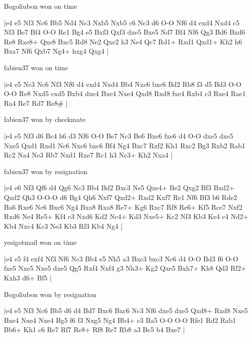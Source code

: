 Bogoliubon won on time

\makegametitle
|e4 e5 Nf3 Nc6 Bb5 Nd4 Nc3 Nxb5 Nxb5 c6 Nc3 d6 O-O Nf6 d4 exd4 Nxd4 c5 Nf3 Be7 Bf4 O-O Re1 Bg4 e5 Bxf3 Qxf3 dxe5 Bxe5 Nd7 Bf4 Nf6 Qg3 Bd6 Bxd6 Re8 Rxe8+ Qxe8 Bxc5 Rd8 Ne2 Qxe2 h3 Ne4 Qc7 Rd1+ Rxd1 Qxd1+ Kh2 h6 Bxa7 Nf6 Qxb7 Ng4+ hxg4 Qxg4  |

\showboard

fabien37 won on time

\makegametitle
|e4 e5 Nc3 Nc6 Nf3 Nf6 d4 exd4 Nxd4 Bb4 Nxc6 bxc6 Bd2 Rb8 f3 d5 Bd3 O-O O-O Re8 Nxd5 cxd5 Bxb4 dxe4 Bxe4 Nxe4 Qxd8 Rxd8 fxe4 Rxb4 c3 Rxe4 Rae1 Ra4 Re7 Rd7 Re8\#  |

\showboard

fabien37 won by checkmate

\makegametitle
|e4 e5 Nf3 d6 Bc4 h6 d3 Nf6 O-O Be7 Nc3 Be6 Bxe6 fxe6 d4 O-O dxe5 dxe5 Nxe5 Qxd1 Rxd1 Nc6 Nxc6 bxc6 Bf4 Ng4 Bxc7 Rxf2 Kh1 Rxc2 Bg3 Rxb2 Rab1 Rc2 Na4 Ne3 Rb7 Nxd1 Rxe7 Rc1 h3 Nc3+ Kh2 Nxa4  |

\showboard

fabien37 won by resignation

\makegametitle
|e4 e6 Nf3 Qf6 d4 Qg6 Nc3 Bb4 Bd2 Bxc3 Ne5 Qxe4+ Be2 Qxg2 Bf3 Bxd2+ Qxd2 Qh3 O-O-O d6 Bg4 Qh6 Nxf7 Qxd2+ Rxd2 Kxf7 Re1 Nf6 Bf3 b6 Rde2 Ba6 Rxe6 Nc6 Bxc6 Ng4 Bxa8 Rxa8 Re7+ Kg6 Rxc7 Rf8 Re6+ Kf5 Rce7 Nxf2 Rxd6 Ne4 Re5+ Kf4 c3 Nxd6 Kd2 Nc4+ Kd3 Nxe5+ Kc2 Nf3 Kb3 Ke4 c4 Nd2+ Kb4 Nxc4 Kc3 Ne3 Kb3 Rf3 Kb4 Ng4  |

\showboard

yesigotmail won on time

\makegametitle
|e4 e5 f4 exf4 Nf3 Nf6 Nc3 Bb4 e5 Nh5 a3 Bxc3 bxc3 Nc6 d4 O-O Bd3 f6 O-O fxe5 Nxe5 Nxe5 dxe5 Qg5 Rxf4 Nxf4 g3 Nh3+ Kg2 Qxe5 Bxh7+ Kh8 Qd3 Rf2+ Kxh3 d6+ Bf5  |

\showboard

Bogoliubon won by resignation

\makegametitle
|e4 e5 Nf3 Nc6 Bb5 d6 d4 Bd7 Bxc6 Bxc6 Nc3 Nf6 dxe5 dxe5 Qxd8+ Rxd8 Nxe5 Bxe4 Nxe4 Nxe4 Bg5 f6 f3 Nxg5 Ng4 Bb4+ c3 Ba5 O-O O-O Rfe1 Rd2 Rab1 Bb6+ Kh1 c6 Re7 Rf7 Re8+ Rf8 Re7 Rb8 a3 Bc5 b4 Bxe7  |

